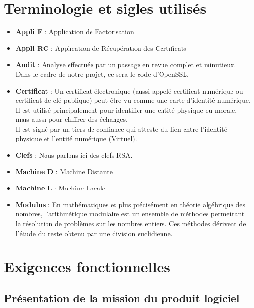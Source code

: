 \documentclass[a4paper,11pt,french]{article}
\begin{document}
\section{Terminologie et sigles utilisés}
\begin{itemize}
	\item \textbf{Appli F} : Application de Factorisation
	\item \textbf{Appli RC} : Application de Récupération des Certificats
	\item \textbf{Audit} : Analyse effectuée par un passage en revue complet et minutieux. Dans le cadre de notre projet, ce sera le code d’OpenSSL.
	\item \textbf{Certificat} : Un certificat électronique (aussi appelé certificat numérique ou certificat de clé publique) peut être vu comme une carte d'identité numérique. Il est utilisé principalement pour identifier une entité physique ou morale, mais aussi pour chiffrer des échanges. \\Il est signé par un tiers de confiance qui atteste du lien entre l'identité physique et l'entité numérique (Virtuel).
	\item \textbf{Clefs} : Nous parlons ici des clefs RSA.
	\item \textbf{Machine D} : Machine Distante
	\item \textbf{Machine L} : Machine Locale
	\item \textbf{Modulus} : En mathématiques et plus précisément en théorie algébrique des nombres, l’arithmétique modulaire est un ensemble de méthodes permettant la résolution de problèmes sur les nombres entiers. Ces méthodes dérivent de l’étude du reste obtenu par une division euclidienne.
\end{itemize}

\section{Exigences fonctionnelles}
\subsection{Présentation de la mission du produit logiciel}
\end{document}
